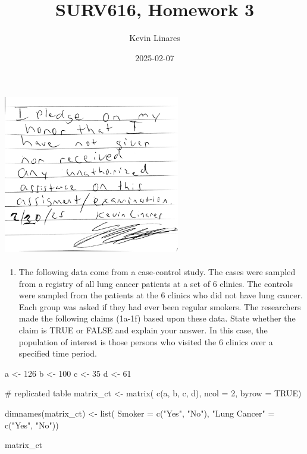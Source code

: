 \documentclass[
  letterpaper,
  DIV=11,
  numbers=noendperiod]{scrartcl}
\title{SURV616, Homework 3}
\author{Kevin Linares}
\date{2025-02-07}
\newenvironment{Shaded}{\begin{snugshade}}{\end{snugshade}}
\newcommand{\AttributeTok}[1]{\textcolor[rgb]{0.40,0.45,0.13}{#1}}
\newcommand{\CommentTok}[1]{\textcolor[rgb]{0.37,0.37,0.37}{#1}}
\newcommand{\ConstantTok}[1]{\textcolor[rgb]{0.56,0.35,0.01}{#1}}
\newcommand{\DecValTok}[1]{\textcolor[rgb]{0.68,0.00,0.00}{#1}}
\newcommand{\FunctionTok}[1]{\textcolor[rgb]{0.28,0.35,0.67}{#1}}
\newcommand{\NormalTok}[1]{\textcolor[rgb]{0.00,0.23,0.31}{#1}}
\newcommand{\OtherTok}[1]{\textcolor[rgb]{0.00,0.23,0.31}{#1}}
\newcommand{\StringTok}[1]{\textcolor[rgb]{0.13,0.47,0.30}{#1}}
\providecommand{\tightlist}{%
  \setlength{\itemsep}{0pt}\setlength{\parskip}{0pt}}\usepackage{longtable,booktabs,array}
\begin{document}
\maketitle


\subsection{\texorpdfstring{\protect\includegraphics[width=3.03125in,height=\textheight]{honor_hw3.png}}{}}\label{section}

\begin{enumerate}
\def\labelenumi{\arabic{enumi}.}
\tightlist
\item
  The following data come from a case-control study. The cases were
  sampled from a registry of all lung cancer patients at a set of 6
  clinics. The controls were sampled from the patients at the 6 clinics
  who did not have lung cancer. Each group was asked if they had ever
  been regular smokers. The researchers made the following claims
  (1a-1f) based upon these data. State whether the claim is TRUE or
  FALSE and explain your answer. In this case, the population of
  interest is those persons who visited the 6 clinics over a specified
  time period.
\end{enumerate}

\begin{Shaded}
\begin{Highlighting}[]
\NormalTok{a }\OtherTok{\textless{}{-}} \DecValTok{126}
\NormalTok{b }\OtherTok{\textless{}{-}} \DecValTok{100} 
\NormalTok{c }\OtherTok{\textless{}{-}} \DecValTok{35}
\NormalTok{d }\OtherTok{\textless{}{-}} \DecValTok{61}

\CommentTok{\# replicated table}
\NormalTok{matrix\_ct }\OtherTok{\textless{}{-}} \FunctionTok{matrix}\NormalTok{(}
  \FunctionTok{c}\NormalTok{(a, b, c, d),}
  \AttributeTok{ncol =} \DecValTok{2}\NormalTok{, }\AttributeTok{byrow =} \ConstantTok{TRUE}\NormalTok{)}

\FunctionTok{dimnames}\NormalTok{(matrix\_ct) }\OtherTok{\textless{}{-}} \FunctionTok{list}\NormalTok{(}
  \AttributeTok{Smoker =} \FunctionTok{c}\NormalTok{(}\StringTok{"Yes"}\NormalTok{, }\StringTok{"No"}\NormalTok{),}
  \StringTok{"Lung Cancer"} \OtherTok{=} \FunctionTok{c}\NormalTok{(}\StringTok{"Yes"}\NormalTok{, }\StringTok{"No"}\NormalTok{))}

\NormalTok{matrix\_ct }
\end{Highlighting}
\end{Shaded}
\end{document}

